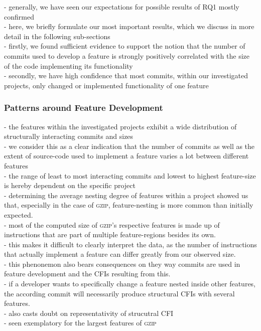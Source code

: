 - generally, we have seen our expectations for possible results of RQ1 mostly confirmed \\
- here, we briefly formulate our most important results, which we discuss in more detail in the following sub-sections \\
- firstly, we found sufficient evidence to support the notion that the number of commits used to develop a feature is strongly positively correlated with the size of the code implementing its functionality \\ 
- secondly, we have high confidence that most commits, within our investigated projects, only changed or implemented functionality of one feature \\

\subsubsection*{Patterns around Feature Development}

- the features within the investigated projects exhibit a wide distribution of structurally interacting commits and sizes \\
- we consider this as a clear indication that the number of commits as well as the extent of source-code used to implement a feature varies a lot between different features \\
- the range of least to most interacting commits and lowest to highest feature-size is hereby dependent on the specific project \\
- determining the average nesting degree of features within a project showed us that, especially in the case of \textsc{gzip}, feature-nesting is more common than initially expected. \\ 
- most of the computed size of \textsc{gzip}'s respective features is made up of instructions that are part of multiple feature-regions besides its own. \\
- this makes it difficult to clearly interpret the data, as the number of instructions that actually implement a feature can differ greatly from our observed size. \\
- this phenonemon also bears consequences on they way commits are used in feature development and the CFIs resulting from this. \\
- if a developer wants to specifically change a feature nested inside other features, the according commit will necessarily produce structural CFIs with several features. \\
- also casts doubt on representativity of strucutral CFI \\
- seen exemplatory for the largest features of \textsc{gzip} \\

